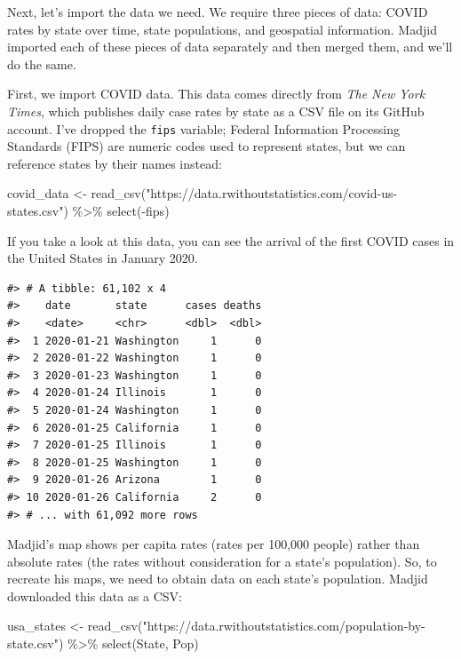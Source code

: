 \documentclass[
]{book}
\newenvironment{Shaded}{\begin{snugshade}}{\end{snugshade}}
\newcommand{\FunctionTok}[1]{\textcolor[rgb]{0.00,0.00,0.00}{#1}}
\newcommand{\NormalTok}[1]{#1}
\newcommand{\OtherTok}[1]{\textcolor[rgb]{0.56,0.35,0.01}{#1}}
\newcommand{\SpecialCharTok}[1]{\textcolor[rgb]{0.00,0.00,0.00}{#1}}
\newcommand{\StringTok}[1]{\textcolor[rgb]{0.31,0.60,0.02}{#1}}
\begin{document}
Next, let's import the data we need. We require three pieces of data: COVID rates by state over time, state populations, and geospatial information. Madjid imported each of these pieces of data separately and then merged them, and we'll do the same.

First, we import COVID data. This data comes directly from \emph{The New York Times}, which publishes daily case rates by state as a CSV file on its GitHub account. I've dropped the \texttt{fips} variable; Federal Information Processing Standards (FIPS) are numeric codes used to represent states, but we can reference states by their names instead:

\begin{Shaded}
\begin{Highlighting}[]
\NormalTok{covid\_data }\OtherTok{\textless{}{-}} \FunctionTok{read\_csv}\NormalTok{(}\StringTok{"https://data.rwithoutstatistics.com/covid{-}us{-}states.csv"}\NormalTok{) }\SpecialCharTok{\%\textgreater{}\%}
  \FunctionTok{select}\NormalTok{(}\SpecialCharTok{{-}}\NormalTok{fips)}
\end{Highlighting}
\end{Shaded}

If you take a look at this data, you can see the arrival of the first COVID cases in the United States in January 2020.

\begin{verbatim}
#> # A tibble: 61,102 x 4
#>    date       state      cases deaths
#>    <date>     <chr>      <dbl>  <dbl>
#>  1 2020-01-21 Washington     1      0
#>  2 2020-01-22 Washington     1      0
#>  3 2020-01-23 Washington     1      0
#>  4 2020-01-24 Illinois       1      0
#>  5 2020-01-24 Washington     1      0
#>  6 2020-01-25 California     1      0
#>  7 2020-01-25 Illinois       1      0
#>  8 2020-01-25 Washington     1      0
#>  9 2020-01-26 Arizona        1      0
#> 10 2020-01-26 California     2      0
#> # ... with 61,092 more rows
\end{verbatim}

Madjid's map shows per capita rates (rates per 100,000 people) rather than absolute rates (the rates without consideration for a state's population). So, to recreate his maps, we need to obtain data on each state's population. Madjid downloaded this data as a CSV:

\begin{Shaded}
\begin{Highlighting}[]
\NormalTok{usa\_states }\OtherTok{\textless{}{-}} \FunctionTok{read\_csv}\NormalTok{(}\StringTok{"https://data.rwithoutstatistics.com/population{-}by{-}state.csv"}\NormalTok{) }\SpecialCharTok{\%\textgreater{}\%}
  \FunctionTok{select}\NormalTok{(State, Pop)}
\end{Highlighting}
\end{Shaded}
\end{document}
